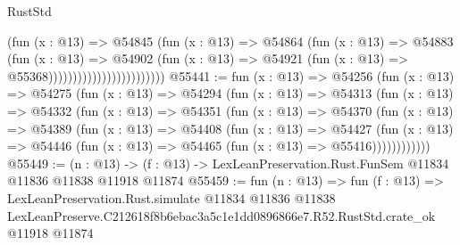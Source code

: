 \begin{lexlean}{RustStd}
\begin{coremodule}
                                        (fun (x : @13) =>
                                        @54845
                                          (fun (x : @13) =>
                                          @54864
                                            (fun (x : @13) =>
                                            @54883
                                              (fun (x : @13) =>
                                              @54902
                                                (fun (x : @13) =>
                                                @54921
                                                  (fun (x : @13) => @55368))))))))))))))))))))))))
@55441 := fun (x : @13) =>
  @54256
    (fun (x : @13) =>
    @54275
      (fun (x : @13) =>
      @54294
        (fun (x : @13) =>
        @54313
          (fun (x : @13) =>
          @54332
            (fun (x : @13) =>
            @54351
              (fun (x : @13) =>
              @54370
                (fun (x : @13) =>
                @54389
                  (fun (x : @13) =>
                  @54408
                    (fun (x : @13) =>
                    @54427
                      (fun (x : @13) =>
                      @54446 (fun (x : @13) => @54465 (fun (x : @13) => @55416))))))))))))
@55449 := (n : @13) ->
  (f : @13) -> LexLeanPreservation.Rust.FunSem @11834 @11836 @11838 @11918 @11874
@55459 := fun (n : @13) =>
  fun (f : @13) =>
  LexLeanPreservation.Rust.simulate
    @11834
    @11836
    @11838
    LexLeanPreserve.C212618f8b6ebac3a5c1e1dd0896866e7.R52.RustStd.crate_ok
    @11918
    @11874
\end{coremodule}
\end{lexlean}
